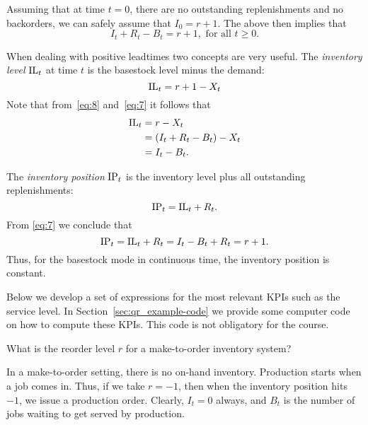 Assuming that at time $t=0$,
there are no outstanding replenishments and no backorders, we can
safely assume that $I_0 = r+1$. The above then implies that
\begin{equation}
  \label{eq:7}
   I_t + R_t - B_t = r+1, \text{ for all }  t\geq 0.
\end{equation}


When dealing with positive leadtimes two concepts are very useful. The \emph{inventory level} $\textrm{IL}_t$ at time $t$ is the basestock level minus the demand: 
\begin{equation}\label{eq:23}
  \textrm{IL}_t = r+1 - X_t
\end{equation}
Note that from~\eqref{eq:8} and~\eqref{eq:7} it follows that
\begin{equation*}
  \begin{split}
  \textrm{IL}_t 
&=r - X_t \\
&= (I_t + R_t - B_t) - X_t \\
&= I_t - B_t.
  \end{split}
\end{equation*}


The \emph{inventory position} $\textrm{IP}_t$ is the inventory level plus all outstanding replenishments:
\begin{equation*}
  \textrm{IP}_t = \textrm{IL}_t + R_t.
\end{equation*}
From \eqref{eq:7} we conclude that 
\begin{equation}\label{eq:20}
\textrm{IP}_t =\textrm{IL}_t + R_t = I_t - B_t +R_t = r+1.
\end{equation}
Thus, for the basestock mode in continuous time, the inventory position is constant. 

\begin{remark}
Below we develop a set of expressions for the most relevant KPIs such
as the service level. In Section~\ref{sec:qr_example-code} we provide some computer code on how to compute these KPIs. This code is not obligatory for the course. 
\end{remark}


\begin{question}
  What is the reorder level $r$ for a make-to-order inventory system?
\end{question}
\begin{solution}
  In a make-to-order setting, there is no on-hand
  inventory. Production starts when a job comes in. Thus, if we take
  $r=-1$, then when the inventory position hits $-1$, we issue a
  production order. Clearly, $I_t=0$ always, and $B_t$ is the number
  of jobs waiting to get served by production.
\end{solution}


